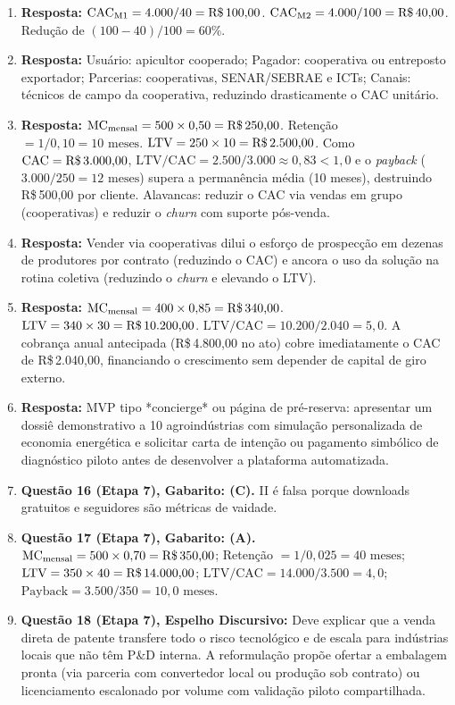 \begin{boxGabarito}
\begin{enumerate}[leftmargin=1.5em, itemsep=4pt]
    \item \textbf{Resposta:} $\text{CAC}_{\text{M1}} = 4.000 / 40 = \text{R\$\,100,00}$. $\text{CAC}_{\text{M2}} = 4.000 / 100 = \text{R\$\,40,00}$. Redução de $(100 - 40)/100 = 60\%$.
    \item \textbf{Resposta:} Usuário: apicultor cooperado; Pagador: cooperativa ou entreposto exportador; Parcerias: cooperativas, SENAR/SEBRAE e ICTs; Canais: técnicos de campo da cooperativa, reduzindo drasticamente o CAC unitário.
    \item \textbf{Resposta:} $\text{MC}_{\text{mensal}} = 500 \times 0{,}50 = \text{R\$\,250,00}$. Retenção $= 1 / 0{,}10 = 10\text{ meses}$. $\text{LTV} = 250 \times 10 = \text{R\$\,2.500,00}$. Como $\text{CAC} = \text{R\$\,3.000,00}$, $\text{LTV/CAC} = 2.500 / 3.000 \approx 0{,}83 < 1{,}0$ e o \textit{payback} ($3.000 / 250 = 12\text{ meses}$) supera a permanência média (10 meses), destruindo R\$\,500,00 por cliente. Alavancas: reduzir o CAC via vendas em grupo (cooperativas) e reduzir o \textit{churn} com suporte pós-venda.
    \item \textbf{Resposta:} Vender via cooperativas dilui o esforço de prospecção em dezenas de produtores por contrato (reduzindo o CAC) e ancora o uso da solução na rotina coletiva (reduzindo o \textit{churn} e elevando o LTV).
    \item \textbf{Resposta:} $\text{MC}_{\text{mensal}} = 400 \times 0{,}85 = \text{R\$\,340,00}$. $\text{LTV} = 340 \times 30 = \text{R\$\,10.200,00}$. $\text{LTV/CAC} = 10.200 / 2.040 = 5{,}0$. A cobrança anual antecipada (R\$\,4.800,00 no ato) cobre imediatamente o CAC de R\$\,2.040,00, financiando o crescimento sem depender de capital de giro externo.
    \item \textbf{Resposta:} MVP tipo *concierge* ou página de pré-reserva: apresentar um dossiê demonstrativo a 10 agroindústrias com simulação personalizada de economia energética e solicitar carta de intenção ou pagamento simbólico de diagnóstico piloto antes de desenvolver a plataforma automatizada.
    \item \textbf{Questão 16 (Etapa 7), Gabarito: (C).} II é falsa porque downloads gratuitos e seguidores são métricas de vaidade.
    \item \textbf{Questão 17 (Etapa 7), Gabarito: (A).} $\text{MC}_{\text{mensal}} = 500 \times 0{,}70 = \text{R\$\,350,00}$; Retenção $= 1 / 0{,}025 = 40\text{ meses}$; $\text{LTV} = 350 \times 40 = \text{R\$\,14.000,00}$; $\text{LTV/CAC} = 14.000 / 3.500 = 4{,}0$; $\text{Payback} = 3.500 / 350 = 10{,}0\text{ meses}$.
    \item \textbf{Questão 18 (Etapa 7), Espelho Discursivo:} Deve explicar que a venda direta de patente transfere todo o risco tecnológico e de escala para indústrias locais que não têm P\&D interna. A reformulação propõe ofertar a embalagem pronta (via parceria com convertedor local ou produção sob contrato) ou licenciamento escalonado por volume com validação piloto compartilhada.
  \end{enumerate}
\end{boxGabarito}

